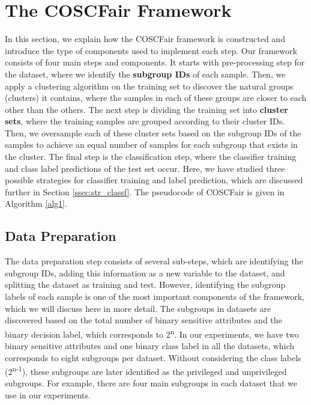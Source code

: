 \section{The COSCFair Framework} \label{sec:framework}

In this section, we explain how the COSCFair framework is constructed and introduce the type of components used to implement each step. Our framework consists of four main steps and components. It starts with pre-processing step for the dataset, where we identify the \textbf{subgroup IDs} of each sample. Then, we apply a clustering algorithm on the training set to discover the natural groups (clusters) it contains, where the samples in each of these groups are closer to each other than the others. The next step is dividing the training set into \textbf{cluster sets}, where the training samples are grouped according to their cluster IDs. Then, we oversample each of these cluster sets based on the subgroup IDs of the samples to achieve an equal number of samples for each subgroup that exists in the cluster. The final step is the classification step, where the classifier training and class label predictions of the test set occur. Here, we have studied three possible strategies for classifier training and label prediction, which are discussed further in Section \ref{ssec:str_classf}. The pseudocode of COSCFair is given in Algorithm \ref{alg1}.




\subsection{Data Preparation}\label{ssec:dataprep}

The data preparation step consists of several sub-steps, which are identifying the subgroup IDs, adding this information as a new variable to the dataset, and splitting the dataset as training and test. However, identifying the subgroup labels of each sample is one of the most important components of the framework, which we will discuss here in more detail. The subgroups in datasets are discovered based on the total number of binary sensitive attributes and the binary decision label, which corresponds to 2\textsuperscript{n}. In our experiments, we have two binary sensitive attributes and one binary class label in all the datasets, which corresponds to eight subgroups per dataset. Without considering the class labels (2\textsuperscript{n-1}), these subgroups are later identified as the privileged and unprivileged subgroups. For example, there are four main subgroups in each dataset that we use in our experiments.

